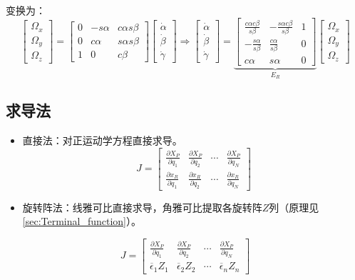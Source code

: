 \documentclass[
12pt, %
a4paper, 
oneside, %
headinclude,footinclude, %
]{scrartcl}
\begin{document}
\begin{itemize}
变换为：
$$
\begin{bmatrix} \Omega_x \\ \Omega_y \\ \Omega_z \end{bmatrix}
=
\begin{bmatrix} 0 & -s\alpha & c\alpha s\beta \\ 0 & c\alpha & s\alpha s\beta \\ 1 & 0 & c\beta \end{bmatrix}
\begin{bmatrix} \dot{\alpha} \\ \dot{\beta} \\ \dot{\gamma} \end{bmatrix}
\Rightarrow 
\begin{bmatrix} \dot{\alpha} \\ \dot{\beta} \\ \dot{\gamma} \end{bmatrix}
=
\underbrace{\begin{bmatrix}
\frac{c\alpha c\beta}{s\beta} & -\frac{s\alpha c\beta}{s\beta} & 1 \\
-\frac{s\alpha}{s\beta} & \frac{c\alpha}{s\beta} & 0 \\
c\alpha & s\alpha & 0
\end{bmatrix}}_{E_R}
\begin{bmatrix} \Omega_x \\ \Omega_y \\ \Omega_z \end{bmatrix}
$$
\end{itemize} 
\subsection{求导法}
\begin{itemize}
\item 直接法：对正运动学方程直接求导。
$$ J = \begin{bmatrix} \frac{\partial X_P}{\partial q_1} & \frac{\partial X_P}{\partial q_2} & \cdots & \frac{\partial X_P}{\partial q_N} \\ \frac{\partial x_R}{\partial q_1} & \frac{\partial x_R}{\partial q_2} & \cdots & \frac{\partial x_R}{\partial q_N} \end{bmatrix} $$
\item 旋转阵法：线雅可比直接求导，角雅可比提取各旋转阵$ Z $列（原理见\ref{sec:Terminal_function}）。\label{sec:Terminal_function_back}
\end{itemize} 
$$ J = \begin{bmatrix} \frac{\partial X_P}{\partial q_1} & \frac{\partial X_P}{\partial q_2} & \cdots & \frac{\partial X_P}{\partial q_N} \\ \overline{\epsilon}_1 Z_1 & \overline{\epsilon}_2 Z_2 & \cdots & \overline{\epsilon}_n Z_n \end{bmatrix} $$
\end{document}
